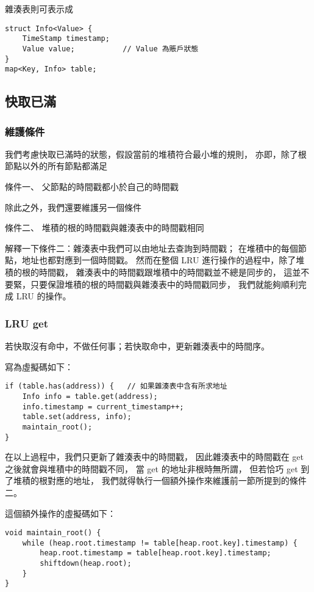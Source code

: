 雜湊表則可表示成

\begin{lstlisting}
struct Info<Value> {
    TimeStamp timestamp;
    Value value;           // Value 為賬戶狀態
}
map<Key, Info> table;
\end{lstlisting}

\subsection{快取已滿}
\subsubsection{維護條件}
我們考慮快取已滿時的狀態，假設當前的堆積符合最小堆的規則，
亦即，除了根節點以外的所有節點都滿足

條件一、 父節點的時間戳都小於自己的時間戳

除此之外，我們還要維護另一個條件

條件二、 堆積的根的時間戳與雜湊表中的時間戳相同

解釋一下條件二：雜湊表中我們可以由地址去查詢到時間戳；
在堆積中的每個節點，地址也都對應到一個時間戳。
然而在整個 LRU 進行操作的過程中，除了堆積的根的時間戳，
雜湊表中的時間戳跟堆積中的時間戳並不總是同步的，
這並不要緊，只要保證堆積的根的時間戳與雜湊表中的時間戳同步，
我們就能夠順利完成 LRU 的操作。

\subsubsection{LRU get}

若快取沒有命中，不做任何事；若快取命中，更新雜湊表中的時間序。

寫為虛擬碼如下：
\begin{lstlisting}
if (table.has(address)) {   // 如果雜湊表中含有所求地址
    Info info = table.get(address);
    info.timestamp = current_timestamp++;
    table.set(address, info);
    maintain_root();
}
\end{lstlisting}

在以上過程中，我們只更新了雜湊表中的時間戳，
因此雜湊表中的時間戳在 get 之後就會與堆積中的時間戳不同，
當 get 的地址非根時無所謂，
但若恰巧 get 到了堆積的根對應的地址，
我們就得執行一個額外操作來維護前一節所提到的條件二。

這個額外操作的虛擬碼如下：

\begin{lstlisting}
void maintain_root() {
    while (heap.root.timestamp != table[heap.root.key].timestamp) {
        heap.root.timestamp = table[heap.root.key].timestamp;
        shiftdown(heap.root);
    }
}
\end{lstlisting}

